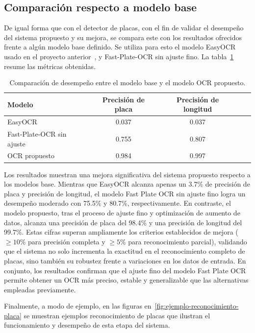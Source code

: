 \subsection{Comparación respecto a modelo base}

De igual forma que con el detector de placas, con el fin de validar el desempeño
del sistema propuesto y su mejora, se compara este con los resultados ofrecidos 
frente a algún modelo base definido. Se utiliza para esto el modelo EasyOCR usado en el 
proyecto anterior~\cite{proyecto_previo}, y Fast-Plate-OCR sin ajuste fino.
La tabla~\ref{tab:ocr-vs-base} resume las métricas obtenidas.

\begin{table}[h]
	\centering
	\begin{tabular}{lcccc}
		\toprule
		\textbf{Modelo} & \textbf{Precisión de placa} & \textbf{Precisión de longitud} \\
		\midrule
		EasyOCR   & 0.037 & 0.037 & \\
		Fast-Plate-OCR sin ajuste   & 0.755 & 0.807 \\
		OCR propuesto & 0.984 & 0.997  \\
		\bottomrule
	\end{tabular}
	\caption{Comparación de desempeño entre el modelo base y el modelo OCR propuesto.}
	\label{tab:ocr-vs-base}
\end{table}

Los resultados muestran una mejora significativa del sistema propuesto respecto a los modelos base. 
Mientras que EasyOCR alcanza apenas un 3.7\% de precisión de placa y precisión de longitud,
el modelo Fast Plate OCR sin ajuste fino logra un desempeño moderado con 75.5\% y 80.7\%, respectivamente.
En contraste, el modelo propuesto, tras el proceso de ajuste fino y optimización de aumento de datos,
alcanza una precisión de placa del 98.4\% y una precisión de longitud del 99.7\%.
Estas cifras superan ampliamente los criterios establecidos de mejora 
($\geq 10\%$ para precisión completa y $\geq 5\%$ para reconocimiento parcial),
validando que el sistema no solo incrementa la exactitud en el reconocimiento completo de placas,
sino también su robustez frente a variaciones en los datos de entrada.
En conjunto, los resultados confirman que el ajuste fino del modelo
Fast Plate OCR permite obtener un OCR más preciso, estable y 
generalizable que las alternativas empleadas previamente.

Finalmente, a modo de ejemplo, en las figuras en~\ref{fig:ejemplo-reconocimiento-placa}
se muestran ejemplos reconocimiento de placas que ilustran el funcionamiento
y desempeño de esta etapa del sistema.

